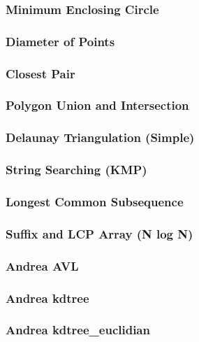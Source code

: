 \subsubsection*{Minimum Enclosing Circle}

\subsubsection*{Diameter of Points}

\subsubsection*{Closest Pair}

\subsubsection*{Polygon Union and Intersection}

\subsubsection*{Delaunay Triangulation (Simple)}

\subsubsection*{String Searching (KMP)}

\subsubsection*{Longest Common Subsequence}

\subsubsection*{Suffix and LCP Array (N log N)}

\subsubsection*{Andrea AVL}

\subsubsection*{Andrea kdtree}

\subsubsection*{Andrea kdtree\_euclidian}

